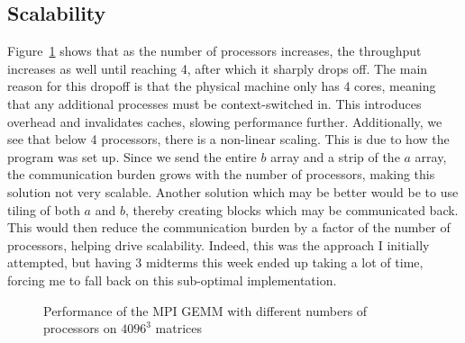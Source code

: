 \documentclass[letterpaper,twocolumn,10pt]{article}
\begin{document}
\subsection{Scalability}
Figure~\ref{fig:processors} shows that as the number of processors increases,
the throughput increases as well until reaching 4, after which it sharply drops
off. The main reason for this dropoff is that the physical machine only has 4
cores, meaning that any additional processes must be context-switched in. This
introduces overhead and invalidates caches, slowing performance further.
Additionally, we see that below 4 processors, there is a non-linear scaling.
This is due to how the program was set up. Since we send the entire $b$ array
and a strip of the $a$ array, the communication burden grows with the number of
processors, making this solution not very scalable. Another solution which may
be better would be to use tiling of both $a$ and $b$, thereby creating blocks
which may be communicated back. This would then reduce the communication burden
by a factor of the number of processors, helping drive scalability. Indeed, this
was the approach I initially attempted, but having 3 midterms this week ended up
taking a lot of time, forcing me to fall back on this sub-optimal implementation.
\begin{figure}
    \caption{\label{fig:processors} Performance of the MPI GEMM with 
    different numbers of processors on $4096^3$ matrices}
\end{figure}
\end{document}

